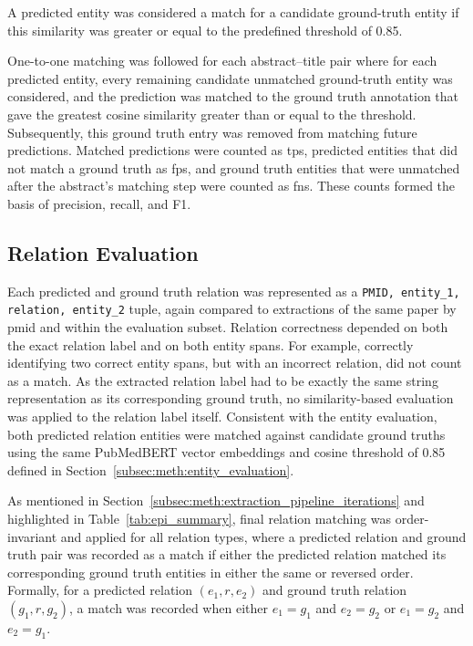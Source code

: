 A predicted entity was considered a match for a candidate ground-truth entity if this similarity was greater or equal to the predefined threshold of 0.85.


One-to-one matching was followed for each abstract--title pair where for each predicted entity, every remaining candidate unmatched ground-truth entity was considered, and the prediction was matched to the ground truth annotation that gave the greatest cosine similarity greater than or equal to the threshold. Subsequently, this ground truth entry was removed from matching future predictions. Matched predictions were counted as \glspl{tp}, predicted entities that did not match a ground truth as \glspl{fp}, and ground truth entities that were unmatched after the abstract's matching step were counted as \glspl{fn}. These counts formed the basis of precision, recall, and F1.

\subsection{Relation Evaluation}
\label{subsec:meth:relation_evaluation}
Each predicted and ground truth relation was represented as a \texttt{PMID, entity\_1, relation, entity\_2} tuple, again compared to extractions of the same paper by \gls{pmid} and within the evaluation subset. Relation correctness depended on both the exact relation label and on both entity spans. For example, correctly identifying two correct entity spans, but with an incorrect relation, did not count as a match. As the extracted relation label had to be exactly the same string representation as its corresponding ground truth, no similarity-based evaluation was applied to the relation label itself. Consistent with the entity evaluation, both predicted relation entities were matched against candidate ground truths using the same PubMedBERT vector embeddings and cosine threshold of 0.85 defined in Section~\ref{subsec:meth:entity_evaluation}.

As mentioned in Section~\ref{subsec:meth:extraction_pipeline_iterations} and highlighted in Table~\ref{tab:epi_summary}, final relation matching was order-invariant and applied for all relation types, where a predicted relation and ground truth pair was recorded as a match if either the predicted relation matched its corresponding ground truth entities in either the same or reversed order. Formally, for a predicted relation $(e_1, r, e_2)$ and ground truth relation $(g_1, r, g_2)$, a match was recorded when either $e_1=g_1$ and $e_2=g_2$ or $e_1=g_2$ and $e_2=g_1$.

